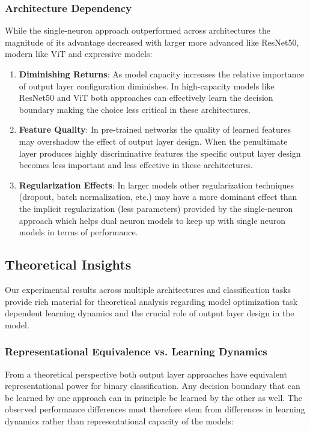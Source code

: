 \subsubsection{Architecture Dependency}

While the single-neuron approach outperformed across architectures the magnitude of its advantage decreased with larger more advanced like ResNet50, modern like ViT and expressive models:

\begin{enumerate}
\item \textbf{Diminishing Returns}: As model capacity increases the relative importance of output layer configuration diminishes. In high-capacity models like ResNet50 and ViT both approaches can effectively learn the decision boundary making the choice less critical in these architectures.

\item \textbf{Feature Quality}: In pre-trained networks the quality of learned features may overshadow the effect of output layer design. When the penultimate layer produces highly discriminative features the specific output layer design becomes less important and less effective in these architectures.

\item \textbf{Regularization Effects}: In larger models other regularization techniques (dropout, batch normalization, etc.) may have a more dominant effect than the implicit regularization (less parameters) provided by the single-neuron approach which helps dual neuron models to keep up with single neuron models in terms of performance.
\end{enumerate}

\subsection{Theoretical Insights}

Our experimental results across multiple architectures and classification tasks provide rich material for theoretical analysis regarding model optimization task dependent learning dynamics and the crucial role of output layer design in the model.

\subsubsection{Representational Equivalence vs. Learning Dynamics}

From a theoretical perspective both output layer approaches have equivalent representational power for binary classification. Any decision boundary that can be learned by one approach can in principle be learned by the other as well. The observed performance differences must therefore stem from differences in learning dynamics rather than representational capacity of the models:

